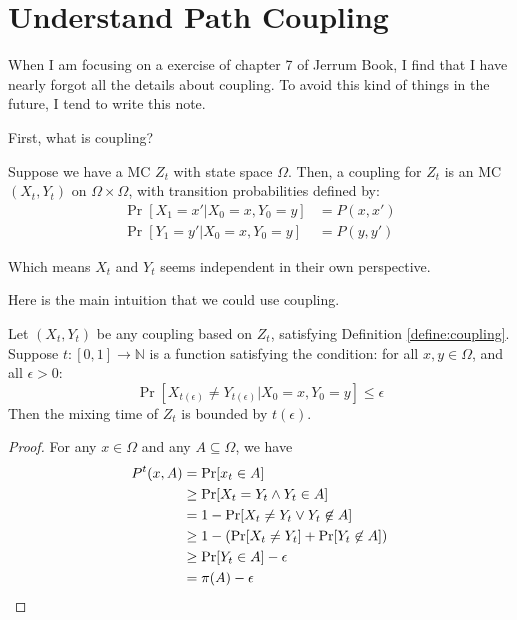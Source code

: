 \section{Understand Path Coupling}
When I am focusing on a exercise of chapter 7 of Jerrum Book,
I find that I have nearly forgot all the details about coupling.
To avoid this kind of things in the future, I tend to write this note.

First, what is coupling?
\begin{define}[Coupling]
  \label{define:coupling}
  Suppose we have a MC $Z_t$ with state space $\Omega$.
  Then, a coupling for $Z_t$ is an MC $(X_t, Y_t)$ on $\Omega\times\Omega$,
  with transition probabilities defined by:
  \begin{align*}
    \Pr[X_1 = x'|X_0 = x, Y_0 = y] &= P(x, x') \\
    \Pr[Y_1 = y'|X_0 = x, Y_0 = y] &= P(y, y')
  \end{align*}
\end{define}
Which means $X_t$ and $Y_t$ seems independent in their own perspective.

Here is the main intuition that we could use coupling.
\begin{lemma}
  Let $(X_t, Y_t)$ be any coupling based on $Z_t$,
  satisfying Definition \ref{define:coupling}.
  Suppose $t:[0,1]\to\mathbb{N}$ is a function satisfying the condition:
  for all $x,y\in\Omega$, and all $\epsilon > 0$:
  \[\Pr[X_{t(\epsilon)} \not= Y_{t(\epsilon)} | X_0 = x, Y_0 = y] \leq \epsilon\]
  Then the mixing time of $Z_t$ is bounded by $t(\epsilon)$.
\end{lemma}
\begin{proof}
  For any $x\in\Omega$ and any $A\subseteq\Omega$, we have
  \begin{align*}
    P^t(x, A) &= \Pr[x_t\in A] \\
    &\geq \Pr[X_t = Y_t \land Y_t\in A] \\
    &= 1 - \Pr[X_t\not= Y_t \lor Y_t\not\in A] \\
    &\geq 1 - (\Pr[X_t\not= Y_t] + \Pr[Y_t\not\in A]) \\
    &\geq \Pr[Y_t\in A] - \epsilon \\
    &= \pi(A) - \epsilon \qedhere
   \end{align*}
\end{proof}

